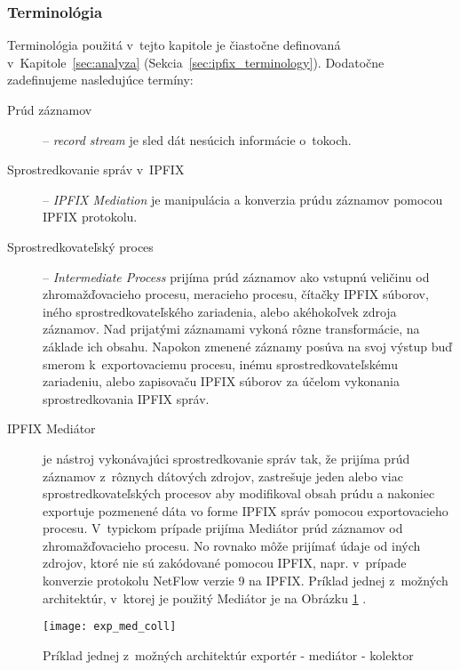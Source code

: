 \subsubsection{Terminológia}
Terminológia použitá v~tejto kapitole je čiastočne definovaná v~Kapitole~\ref{sec:analyza} 
(Sekcia~\ref{sec:ipfix_terminology}). 
Dodatočne zadefinujeme nasledujúce termíny:
\begin{description}
 \item[Prúd záznamov] -- \emph{record stream} je sled dát nesúcich informácie o~tokoch.
 
 \item[Sprostredkovanie správ v~IPFIX] -- \emph{IPFIX Mediation} je manipulácia a konverzia prúdu záznamov
 pomocou IPFIX protokolu.
 
 \item[Sprostredkovateľský proces] -- \emph{Intermediate Process} prijíma prúd záznamov ako vstupnú 
 veličinu od zhromažďovacieho procesu, meracieho procesu, čítačky IPFIX súborov, iného 
 sprostredkovateľského zariadenia, alebo akéhokoľvek zdroja záznamov. Nad prijatými záznamami
 vykoná rôzne transformácie, na základe ich obsahu. Napokon zmenené záznamy posúva na svoj výstup buď
 smerom k~exportovaciemu procesu, inému sprostredkovateľskému zariadeniu, alebo zapisovaču IPFIX súborov
 za účelom vykonania sprostredkovania IPFIX správ.
 
 \item[IPFIX Mediátor] je nástroj vykonávajúci sprostredkovanie správ tak, že prijíma prúd záznamov 
 z~rôznych dátových zdrojov, zastrešuje jeden alebo viac sprostredkovateľských procesov  
 aby modifikoval obsah prúdu a nakoniec exportuje pozmenené dáta vo forme IPFIX správ pomocou exportovacieho
 procesu. V~typickom prípade prijíma Mediátor prúd záznamov od zhromažďovacieho procesu. No rovnako môže
 prijímať údaje od iných zdrojov, ktoré nie sú zakódované pomocou IPFIX, napr. v~prípade konverzie 
 protokolu NetFlow verzie 9 \citep{rfc3954} na IPFIX. Príklad jednej z~možných architektúr, 
 v~ktorej je použitý Mediátor je na Obrázku \ref{o:exp_med_coll} \citep{rfc5982}.
\end{description}

\begin{figure}[ht!]
\centering
\texttt{[image: exp\_med\_coll]}
\caption{Príklad jednej z~možných architektúr exportér - mediátor - kolektor}\label{o:exp_med_coll}
\end{figure}



